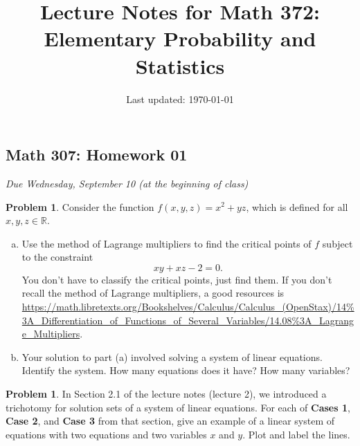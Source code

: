 \documentclass[10pt]{article}
\title{Lecture Notes for Math 372: \\Elementary Probability and Statistics}
\date{Last updated: \today}
\theoremstyle{definition}
\newtheorem{problem}[theorem]{Problem}
\newcommand{\1}[1]{\textbf{1}_{\left[#1\right]}} %
\def\R{\mathbb{R}} %
\begin{document}
\begin{center}
  \section*{Math 307: Homework 01}
  \textit{Due Wednesday, September 10 (at the beginning of class)}
\end{center}


\begin{problem}%
  Consider the function $f(x,y,z) = x^{2}+yz$, which is defined for all
  $x,y,z\in \R$.
  \begin{enumerate}[(a)]
    \item Use the method of Lagrange multipliers to find
    the critical points of $f$ subject to the constraint
    \begin{equation*}
      xy+xz-2=0.
    \end{equation*}
    You don't have to classify the critical points, just find them. If you
    don't recall the method of Lagrange multipliers, a good resources is
    \url{https://math.libretexts.org/Bookshelves/Calculus/Calculus_(OpenStax)/14%3A_Differentiation_of_Functions_of_Several_Variables/14.08%3A_Lagrange_Multipliers}.
    
    \item Your solution to part (a) involved solving a system of linear
    equations. Identify the system. How many equations does it have? How many
    variables?
  \end{enumerate}
\end{problem}

\begin{problem}
  In Section 2.1 of the lecture notes (lecture 2), we introduced a trichotomy
  for solution sets of a system of linear equations. For each of \textbf{Cases
    1}, \textbf{Case 2}, and \textbf{Case 3} from that section, give an
  example of a linear system of equations with two equations and two variables
  $x$ and $y$. Plot and label the lines.
\end{problem}
\end{document}
